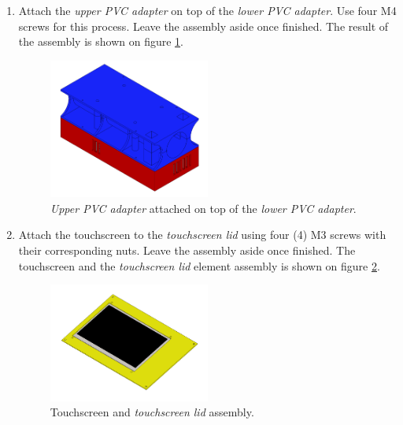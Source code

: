 \documentclass{article}
\begin{document}
\begin{enumerate}
    \item Attach the \textit{upper PVC adapter} on top of the \textit{lower PVC adapter}. Use four M4 screws for this process. Leave the assembly aside once finished. The result of the assembly is shown on figure \ref{fig:electronics_3}.
    
    \begin{figure}[H]
        \centering
        \includegraphics[width=0.5\textwidth]{images/electronics/step_C.png}
        \caption{\textit{Upper PVC adapter} attached on top of the \textit{lower PVC adapter}.}
        \label{fig:electronics_3}
    \end{figure}
    
    \item Attach the touchscreen to the \textit{touchscreen lid} using four (4) M3 screws with their corresponding nuts. Leave the assembly aside once finished. The touchscreen and the \textit{touchscreen lid} element assembly is shown on figure \ref{fig:electronics_4}.
    
    \begin{figure}[H]
        \centering
        \includegraphics[width=0.5\textwidth]{images/electronics/step_D.png}
        \caption{Touchscreen and \textit{touchscreen lid} assembly.}
        \label{fig:electronics_4}
    \end{figure}
    

\end{enumerate}
\end{document}
